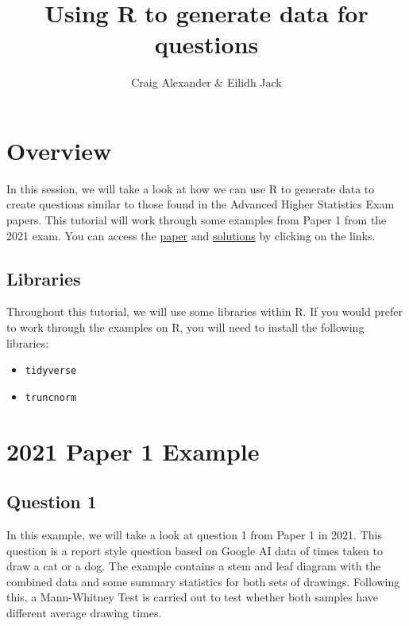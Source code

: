 \documentclass[
]{book}
\title{Using R to generate data for questions}
\author{Craig Alexander \& Eilidh Jack}
\date{}
\providecommand{\tightlist}{%
  \setlength{\itemsep}{0pt}\setlength{\parskip}{0pt}}
\begin{document}
\maketitle

{
\setcounter{tocdepth}{1}
\tableofcontents
}
\hypertarget{overview}{%
\chapter{Overview}\label{overview}}

In this session, we will take a look at how we can use R to generate data to create questions similar to those found in the Advanced Higher Statistics Exam papers. This tutorial will work through some examples from Paper 1 from the 2021 exam. You can access the \href{https://www.sqa.org.uk/sqa/files_ccc/NAH_Statistics_Paper1_2021.pdf}{paper} and \href{Advanced\%20Higher\%20Statistic\%20marking\%20instructions\%20paper\%201}{solutions} by clicking on the links.

\hypertarget{libraries}{%
\section{Libraries}\label{libraries}}

Throughout this tutorial, we will use some libraries within R. If you would prefer to work through the examples on R, you will need to install the following libraries:

\begin{itemize}
\tightlist
\item
  \texttt{tidyverse}
\item
  \texttt{truncnorm}
\end{itemize}

\hypertarget{paper-1-example}{%
\chapter{2021 Paper 1 Example}\label{paper-1-example}}

\hypertarget{question-1}{%
\section{Question 1}\label{question-1}}

In this example, we will take a look at question 1 from Paper 1 in 2021. This question is a report style question based on Google AI data of times taken to draw a cat or a dog. The example contains a stem and leaf diagram with the combined data and some summary statistics for both sets of drawings. Following this, a Mann-Whitney Test is carried out to test whether both samples have different average drawing times.
\end{document}
